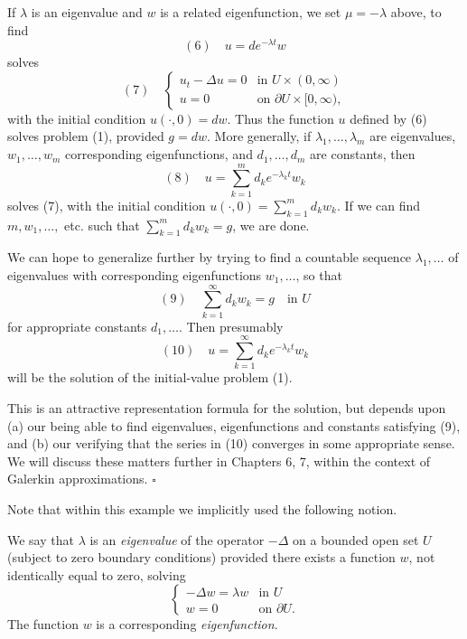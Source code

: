 \begin{example}
If $\lambda$ is an eigenvalue and $w$ is a related eigenfunction, we set $\mu = -\lambda$ above, to find
$$(6) \quad u = de^{-\lambda t}w$$
solves
$$(7) \quad \begin{cases}
u_t - \Delta u = 0 & \text{in } U \times (0, \infty) \\
u = 0 & \text{on } \partial U \times [0, \infty),
\end{cases}$$
with the initial condition $u(\cdot, 0) = dw$. Thus the function $u$ defined by (6) solves problem (1), provided $g = dw$. More generally, if $\lambda_1, \ldots, \lambda_m$ are eigenvalues, $w_1, \ldots, w_m$ corresponding eigenfunctions, and $d_1, \ldots, d_m$ are constants, then
$$(8) \quad u = \sum_{k=1}^{m} d_k e^{-\lambda_k t} w_k$$
solves (7), with the initial condition $u(\cdot, 0) = \sum_{k=1}^{m} d_k w_k$. If we can find $m, w_1, \ldots,$ etc. such that $\sum_{k=1}^{m} d_k w_k = g$, we are done.

We can hope to generalize further by trying to find a countable sequence $\lambda_1, \ldots$ of eigenvalues with corresponding eigenfunctions $w_1, \ldots$, so that
$$(9) \quad \sum_{k=1}^{\infty} d_k w_k = g \quad \text{in } U$$
for appropriate constants $d_1, \ldots$. Then presumably
$$(10) \quad u = \sum_{k=1}^{\infty} d_k e^{-\lambda_k t} w_k$$
will be the solution of the initial-value problem (1).

This is an attractive representation formula for the solution, but depends upon (a) our being able to find eigenvalues, eigenfunctions and constants satisfying (9), and (b) our verifying that the series in (10) converges in some appropriate sense. We will discuss these matters further in Chapters 6, 7, within the context of Galerkin approximations. $\square$
\end{example}

Note that within this example we implicitly used the following notion.

\begin{definition}
\label{def:eigenvalue-eigenfunction}
We say that $\lambda$ is an \textit{eigenvalue} of the operator $-\Delta$ on a bounded open set $U$ (subject to zero boundary conditions) provided there exists a function $w$, not identically equal to zero, solving
$$\begin{cases}
-\Delta w = \lambda w & \text{in } U \\
w = 0 & \text{on } \partial U.
\end{cases}$$
The function $w$ is a corresponding \textit{eigenfunction}.
\end{definition}

